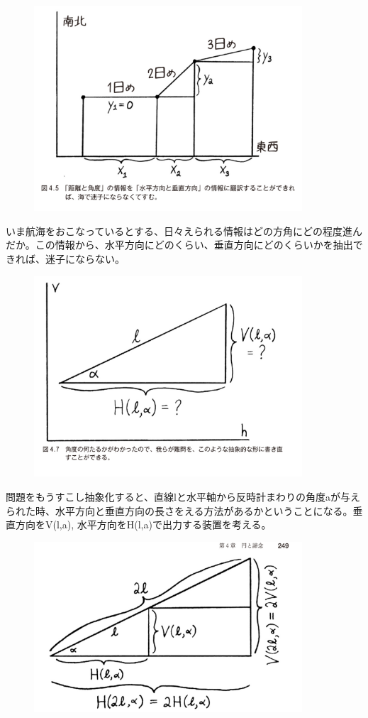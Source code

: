 \documentclass[dvipdfmx]{jsarticle}
\begin{document}
\begin{figure}[h]
  \centering
  \includegraphics[width=10cm]{images/burn_math_4-5.png}
\end{figure}

いま航海をおこなっているとする、日々えられる情報はどの方角にどの程度進んだか。この情報から、水平方向にどのくらい、垂直方向にどのくらいかを抽出できれば、迷子にならない。

\begin{figure}[h]
  \centering
  \includegraphics[width=10cm]{images/burn_math_4-7.png}
\end{figure}

問題をもうすこし抽象化すると、直線lと水平軸から反時計まわりの角度aが与えられた時、水平方向と垂直方向の長さをえる方法があるかということになる。垂直方向をV(l,a), 水平方向をH(l,a)で出力する装置を考える。

\begin{figure}[h]
  \centering
  \includegraphics[width=10cm]{images/burn_math_4-8.png}
\end{figure}
\end{document}

